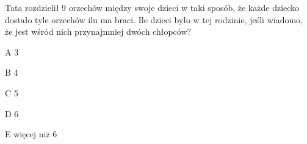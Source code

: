 \begin{tresc}
Tata rozdzielił 9 orzechów między swoje dzieci w taki sposób, że każde dziecko dostało tyle orzechów ilu ma braci. Ile dzieci było w tej rodzinie, jeśli wiadomo, że jest wśród nich przynajmniej dwóch chłopców?
\end{tresc}
\begin{wariant}{A} 3 \end{wariant}
\begin{wariant}{B} 4 \end{wariant}
\begin{wariant}{C} 5 \end{wariant}
\begin{wariant}{D} 6 \end{wariant}
\begin{wariant}{E} więcej niż 6 \end{wariant}
